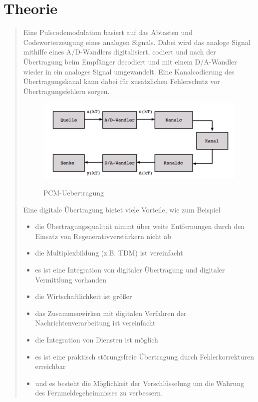 \section{Theorie}
\begin{quote}

	Eine Pulscodemodulation basiert auf das Abtasten und Codeworterzeugung eines
	analogen Signals. Dabei wird das analoge Signal mithilfe eines A/D-Wandlers
	digitalisiert, codiert und nach der Übertragung beim Empfänger decodiert und
	mit einem D/A-Wandler wieder in ein analoges Signal umgewandelt. Eine
	Kanalcodierung des Übertragungskanal kann dabei für zusätzlichen Fehlerschutz
	vor Übertragungsfehlern sorgen.\\
	
	\begin{figure}[H]
    \centering
        \includegraphics[scale=0.7, trim = 0cm 0cm 0cm 0cm, clip]{./Bilder/PCM-Uebertragung}
            \caption{PCM-Uebertragung}
            \cite{PCM-Uebertragung}
    \end{figure}
    
	
	Eine digitale Übertragung bietet viele Vorteile, wie zum Beispiel
	\begin{itemize}
		\item die Übertragungsqualität nimmt über weite Entfernungen durch den Einsatz
		von Regenerativverstärkern nicht ab
		\item die Multiplexbildung (z.B. TDM) ist vereinfacht
		\item es ist eine Integration von digitaler Übertragung und digitaler
		Vermittlung vorhanden
		\item die Wirtschaftlichkeit ist größer
		\item das Zusammenwirken mit digitalen Verfahren der Nachrichtenverarbeitung
		ist vereinfacht
		\item die Integration von Diensten ist möglich 
		\item es ist eine praktisch störungsfreie Übertragung durch Fehlerkorrekturen
		erreichbar
		\item und es besteht die Möglichkeit der Verschlüsselung um die Wahrung des
		Fernmeldegeheimnisses zu verbessern.
	\end{itemize}
	

\end{quote}
